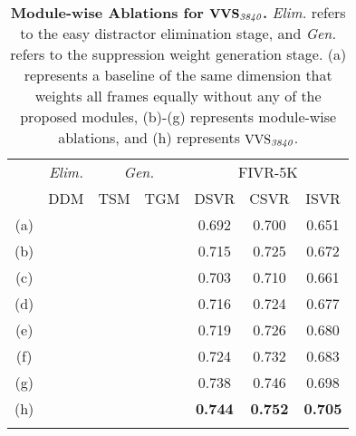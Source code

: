 \documentclass[10pt,twocolumn,letterpaper]{article}
\newcommand{\cmark}{\ding{51}}
\begin{document}
     
        \begin{table}[!t]
            \footnotesize
            \centering
            \begin{tabular}{c|ccc|ccc}
                \cmidrule[\heavyrulewidth]{1-7}
                \morecmidrules
                \cmidrule[\heavyrulewidth]{1-7}
\multicolumn{1}{c}{\multirow{2}{*}[-.3em]{$\textbf{\textup{VVS}}_{\textit{3840}}$}}
                & \multicolumn{1}{|c|}{\textit{Elim.}}  & \multicolumn{2}{c|}{\textit{Gen.}} & \multicolumn{3}{c}{FIVR-5K} \\ \cmidrule(){2-7} 
               
                    &\multicolumn{1}{c|}{DDM} & TSM    & TGM    & DSVR  & CSVR  & ISVR  \\ \midrule 
                (a) &       &        &        & 0.692 & 0.700 & 0.651 \\ \midrule
                (b) &\cmark &        &        & 0.715 & 0.725 & 0.672 \\ \midrule
                (c) &       & \cmark &        & 0.703 & 0.710 & 0.661 \\
                (d) &       &        & \cmark & 0.716 & 0.724 & 0.677 \\
                (e) &       & \cmark & \cmark & 0.719 & 0.726 & 0.680 \\ \midrule 
                (f) &\cmark & \cmark &        & 0.724 & 0.732 & 0.683 \\ 
                (g) &\cmark &        & \cmark & 0.738 & 0.746 & 0.698 \\ \midrule
                (h) &\cmark & \cmark & \cmark & \textbf{0.744} & \textbf{0.752} & \textbf{0.705} \\
                \cmidrule[\heavyrulewidth]{1-7}
                \morecmidrules
                \cmidrule[\heavyrulewidth]{1-7}
            \end{tabular} \vspace{-4mm}
            \caption{\textbf{Module-wise Ablations for $\textbf{\textup{VVS}}_{\textit{3840}}$\textbf{.} }\textit{Elim.} refers to the easy distractor elimination stage, and \textit{Gen.} refers to the suppression weight generation stage. (a) represents a baseline of the same dimension that weights all frames equally without any of the proposed modules, (b)-(g) represents module-wise ablations, and (h) represents $\textup{VVS}_{\textit{3840}}$. \vspace{-4mm}}
            \label{tab:module_ablation}
        \end{table}
        
\end{document}

